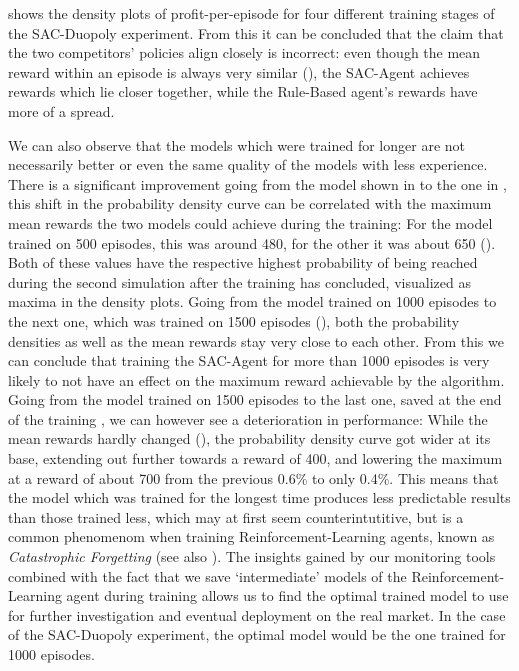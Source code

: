  shows the density plots of profit-per-episode for four different training stages of the SAC-Duopoly experiment. From this it can be concluded that the claim that the two competitors' policies align closely is incorrect: even though the mean reward within an episode is always very similar (), the SAC-Agent achieves rewards which lie closer together, while the Rule-Based agent's rewards have more of a spread.

We can also observe that the models which were trained for longer are not necessarily better or even the same quality of the models with less experience. There is a significant improvement going from the model shown in  to the one in , this shift in the probability density curve can be correlated with the maximum mean rewards the two models could achieve during the training: For the model trained on 500 episodes, this was around 480, for the other it was about 650 (). Both of these values have the respective highest probability of being reached during the second simulation after the training has concluded, visualized as maxima in the density plots. Going from the model trained on 1000 episodes to the next one, which was trained on 1500 episodes (), both the probability densities as well as the mean rewards stay very close to each other. From this we can conclude that training the SAC-Agent for more than 1000 episodes is very likely to not have an effect on the maximum reward achievable by the algorithm. Going from the model trained on 1500 episodes to the last one, saved at the end of the training , we can however see a deterioration in performance: While the mean rewards hardly changed (), the probability density curve got wider at its base, extending out further towards a reward of 400, and lowering the maximum at a reward of about 700 from the previous 0.6\% to only 0.4\%. This means that the model which was trained for the longest time produces less predictable results than those trained less, which may at first seem counterintutitive, but is a common phenomenom when training Reinforcement-Learning agents, known as \emph{Catastrophic Forgetting} (see also \cite{CatastrophicForgetting}). The insights gained by our monitoring tools combined with the fact that we save `intermediate' models of the Reinforcement-Learning agent during training allows us to find the optimal trained model to use for further investigation and eventual deployment on the real market. In the case of the SAC-Duopoly experiment, the optimal model would be the one trained for 1000 episodes.

